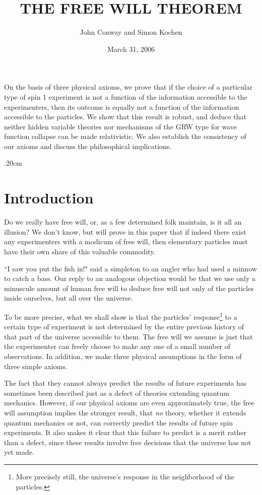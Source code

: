 \documentclass[12pt]{amsart}
\title{THE FREE WILL THEOREM}
\author{John Conway and Simon Kochen}
\date{March 31, 2006}
\begin{document}
\abstract

On the basis of three physical axioms, we prove that if the choice of a particular type of spin 1 experiment is not a function of the information accessible to the experimenters, then its outcome is equally not a function of the information accessible to the particles. We show that this result is robust, and deduce that neither hidden variable theories nor mechanisms of the GRW type for wave function collapse can be made relativistic. We also establish the consistency of our axioms and discuss the philosophical implications. 
\endabstract

\maketitle

\parskip .20cm

\section{Introduction}
Do we really have free will, or, as a few determined folk maintain, is it
all an illusion?  We don't know, but will prove in this paper that if
indeed there exist any experimenters with a modicum of free will, then
elementary particles must have their own share of this valuable
commodity.

``I saw you put the fish in!" said a simpleton to an angler who had used a minnow 
to catch a bass.  Our reply to an analogous objection would be that we use only a minuscule amount of human free will to deduce free will not only of the particles inside ourselves, but all over the universe.

\renewcommand{\thefootnote}{\fnsymbol{footnote}}

To be more precise, what we shall show is that the particles' response\footnote{More precisely still, the universe's response in the neighborhood of the 
particles.} 
to a certain type of experiment is not determined by the entire previous
history of that part of the universe accessible to them.  The free will we
assume is just that the experimenter can freely choose to make any one of a
small number of observations.  In addition, we make three physical
assumptions in the form of three simple axioms.

The fact that they cannot always predict the results of future experiments
has sometimes been described just as a defect of theories extending quantum 
mechanics. However, if our physical axioms are even approximately true, the free 
will assumption implies the stronger result, that {\em no} theory, whether it extends quantum mechanics or not, can correctly predict the results of future spin experiments.  It also makes it clear that this failure to predict is a merit rather than a defect, 
since these results involve free decisions that the universe has not yet made.
\end{document}
